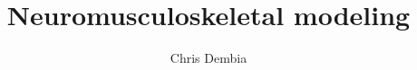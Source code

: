 \documentclass{book}
\begin{document}
\title{Neuromusculoskeletal modeling}
\author{Chris Dembia}
\maketitle

\newpage
\end{document}
